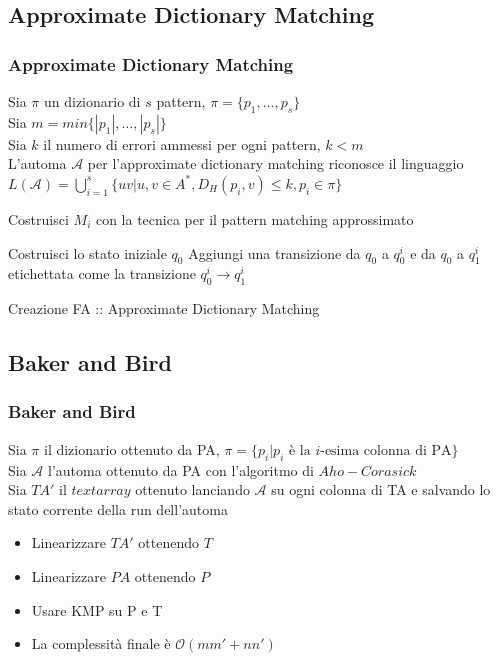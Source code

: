 \documentclass{beamer}
\newcommand{\bigO}{\ensuremath{\mathcal{O}}} %
\begin{document}
\subsection{Approximate Dictionary Matching}
\begin{frame}
\frametitle{Approximate Dictionary Matching}

\begin{definition}
	Sia $\pi$ un dizionario di $s$ pattern, $\pi = \{p_1,\dots,p_s\}$\\
	Sia $m = min\{|p_1|,\dots,|p_s|\}$\\
	Sia $k$ il numero di errori ammessi per ogni pattern, $k < m$ \\
	L'automa $\mathcal{A}$ per l'approximate dictionary matching riconosce il linguaggio $L(\mathcal{A}) =\bigcup_{i=1}^s \{ uv | u,v\in A^*, D_H(p_i,v) \leq k, p_i\in \pi \}$
\end{definition}

\begin{algorithm}[H]
\begin{algorithmic}[1]


\STATE Costruisci $M_i$ con la tecnica per il pattern matching approssimato

\ENDFOR
\STATE Costruisci lo stato iniziale $q_0$
\STATE Aggiungi una transizione da $q_0$ a $q_0^i$ e da $q_0$ a $q_1^i$ etichettata come la transizione $q_0^i \to q_1^i$
\ENDFOR

\end{algorithmic}
\caption{Creazione FA :: Approximate Dictionary Matching}
\end{algorithm}

\end{frame}



\subsection{Baker and Bird}
\begin{frame}
\frametitle{Baker and Bird}
\begin{definition}
	Sia $\pi$ il dizionario ottenuto da PA, $\pi= \{p_i | p_i \text{ è la } i \text{-esima colonna di PA}\}$\\
	Sia $\mathcal{A}$ l'automa ottenuto da PA con l'algoritmo di $Aho-Corasick$\\
	Sia $TA'$ il $text array$ ottenuto lanciando $\mathcal{A}$ su ogni colonna di TA e salvando lo stato corrente della run dell'automa
\end{definition}

\begin{itemize}
\item Linearizzare $TA'$ ottenendo $T$
\item Linearizzare $PA$ ottenendo $P$
\item Usare KMP su P e T
\item La complessità finale è  \bigO{$(mm' + nn')$} 
\end{itemize}


\end{frame}
\end{document}
